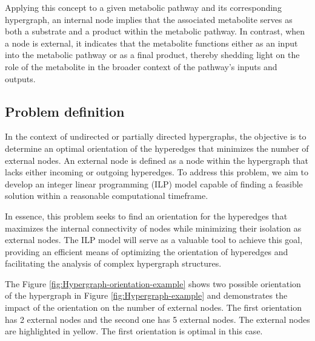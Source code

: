 Applying this concept to a given metabolic pathway and its corresponding hypergraph, an internal node implies that the associated metabolite serves as both a substrate and a product within the metabolic pathway. In contrast, when a node is external, it indicates that the metabolite functions either as an input into the metabolic pathway or as a final product, thereby shedding light on the role of the metabolite in the broader context of the pathway's inputs and outputs.

\subsection{Problem definition}

In the context of undirected or partially directed hypergraphs, the objective is to determine an optimal orientation of the hyperedges that minimizes the number of external nodes. An external node is defined as a node within the hypergraph that lacks either incoming or outgoing hyperedges. To address this problem, we aim to develop an integer linear programming (ILP) model capable of finding a feasible solution within a reasonable computational timeframe.

In essence, this problem seeks to find an orientation for the hyperedges that maximizes the internal connectivity of nodes while minimizing their isolation as external nodes. The ILP model will serve as a valuable tool to achieve this goal, providing an efficient means of optimizing the orientation of hyperedges and facilitating the analysis of complex hypergraph structures.

The Figure \ref{fig:Hypergraph-orientation-example} shows two possible orientation of the hypergraph in Figure \ref{fig:Hypergraph-example} and demonstrates the impact of the orientation on the number of external nodes.
The first orientation has 2 external nodes and the second one has 5 external nodes. The external nodes are highlighted in yellow. The first orientation is optimal in this case.

